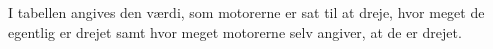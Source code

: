 \label{appendix:motor_test}
I tabellen angives den værdi, som motorerne er sat til at dreje, hvor meget de egentlig er drejet samt hvor meget motorerne selv angiver, at de er drejet.

